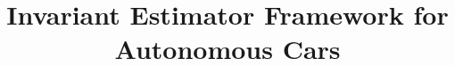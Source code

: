 \documentclass[conference]{IEEEtran}
\begin{document}
  \title{\textbf{Invariant Estimator Framework for Autonomous Cars}}
  \author{
  }

  \maketitle

  
  
  
  
  
\end{document}
